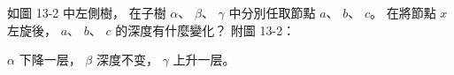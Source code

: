 \startEXERCISE
如圖 13-2 中左側樹，
在子樹 $\alpha$、 $\beta$、 $\gamma$ 中分別任取節點 $a$、 $b$、 $c$。
在將節點 $x$ 左旋後，
 $a$、 $b$、 $c$ 的深度有什麼變化？ 附圖 13-2：

\externalfigure[output/e13_2_3-1]
\stopEXERCISE

\startANSWER
$\alpha$ 下降一层，
 $\beta$ 深度不变，
 $\gamma$ 上升一层。
\stopANSWER
